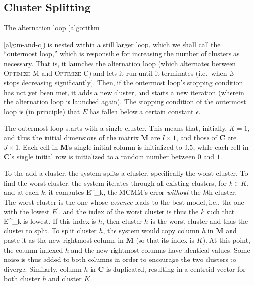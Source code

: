 \subsection{Cluster Splitting}
\label{sec:cl-split}
The alternation loop (algorithm~{\ref{alg:m-and-c}) is nested within a still larger loop, which we shall call the ``outermost loop,'' which is responsible for increasing the number of clusters as necessary. That is, it launches the alternation loop (which alternates between \textsc{Optimize-M} and \textsc{Optimize-C}) and lets it run until it terminates (i.e., when $E$ stops decreasing significantly). Then, if the outermost loop's stopping condition has not yet been met, it adds a new cluster, and starts a new iteration (wherein the alternation loop is launched again). The stopping condition of the outermost loop is (in principle) that $E$ has fallen below a certain constant $\epsilon$.

 The outermost loop starts with a single cluster. This means that, initially, 
 $K = 1$, and thus the initial dimensions of the matrix $\textbf{M}$ are 
 $I \times 1$, and those of $\textbf{C}$ are $J \times 1$. Each cell in $\textbf{M}$'s 
 single initial column is initialized to $0.5$, while each cell in $\textbf{C}$'s 
 single initial row is initialized to a random number between $0$ and $1$.  

To the add a cluster, the system splits a cluster, specifically the worst cluster. To find the worst cluster, 
 the system iterates through all existing clusters, for $k \in K$, and at each $k$, 
it computes E^{\prime}_{k}, the MCMM's error \emph{without} the 
 $k$th cluster.  The worst cluster is the one whose \emph{absence} leads to the best model, 
 i.e., the one with the lowest $E^{\prime}$, and the index of the worst cluster is thus the 
 $k$ such that E^{\prime}_{k} is lowest. If this index is $h$, then cluster $h$ is the 
 worst cluster and thus the cluster to split. To split cluster $h$, 
 the system would copy column $h$ in $\textbf{M}$ and paste it as the new 
 rightmost column in $\textbf{M}$ (so that its index is $K$).  At this point, 
 the column indexed $h$ and the new rightmost columns have identical values.  
 Some noise is thus added to both columns in order to encourage the two clusters to diverge. 
 Similarly, column $h$ in $\textbf{C}$ is duplicated, resulting in a centroid vector 
 for both cluster $h$ and cluster $K$.
 
}
